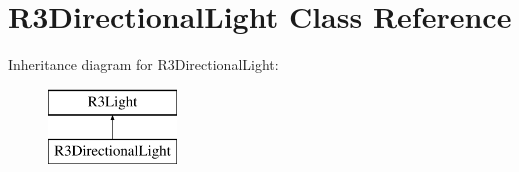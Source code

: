 \hypertarget{class_r3_directional_light}{}\section{R3\+Directional\+Light Class Reference}
\label{class_r3_directional_light}
Inheritance diagram for R3\+Directional\+Light\+:\begin{figure}[H]
\begin{center}
\leavevmode
\includegraphics[height=2.000000cm]{class_r3_directional_light}
\end{center}
\end{figure}
